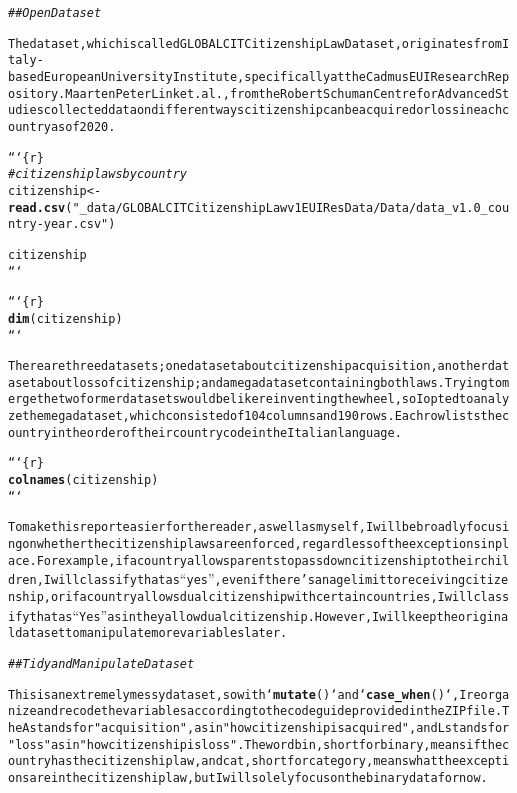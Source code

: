 \documentclass{article}\usepackage[]{graphicx}\usepackage[]{xcolor}
\makeatletter
\newcommand{\hlstr}[1]{\textcolor[rgb]{0.192,0.494,0.8}{#1}}%
\newcommand{\hlcom}[1]{\textcolor[rgb]{0.678,0.584,0.686}{\textit{#1}}}%
\newcommand{\hlkwd}[1]{\textcolor[rgb]{0.737,0.353,0.396}{\textbf{#1}}}%
\newenvironment{kframe}{%
 \def\at@end@of@kframe{}%
 \ifinner\ifhmode%
  \def\at@end@of@kframe{\end{minipage}}%
  \begin{minipage}{\columnwidth}%
 \fi\fi%
 \def\FrameCommand##1{\hskip\@totalleftmargin \hskip-\fboxsep
 \colorbox{shadecolor}{##1}\hskip-\fboxsep
     \hskip-\linewidth \hskip-\@totalleftmargin \hskip\columnwidth}%
 \MakeFramed {\advance\hsize-\width
   \@totalleftmargin\z@ \linewidth\hsize
   \@setminipage}}%
 {\par\unskip\endMakeFramed%
 \at@end@of@kframe}
\newenvironment{knitrout}{}{} %
\makeatother
\begin{document}
\begin{knitrout}
\begin{kframe}
\begin{alltt}
\hlcom{## Open Dataset}

The dataset, which is called GLOBALCIT Citizenship Law Dataset, originates from Italy-based European University Institute, specifically at the Cadmus EUI Research Repository. Maarten Peter Link et. al., from the Robert Schuman Centre for Advanced Studies collected data on different ways citizenship can be acquired or loss in each country as of 2020. 


```\{r\}
\hlcom{# citizenship laws by country}
citizenship <- \hlkwd{read.csv}(\hlstr{"_data/GLOBALCIT Citizenship Law v1 EUI ResData/Data/data_v1.0_country-year.csv"})

citizenship
```

```\{r\}
\hlkwd{dim}(citizenship)
```

There are three datasets; one dataset about citizenship acquisition, another dataset about loss of citizenship; and a mega dataset containing both laws. Trying to merge the two former datasets would be like reinventing the wheel, so I opted to analyze the mega dataset, which consisted of 104 columns and 190 rows. Each row lists the country in the order of their country code in the Italian language. 

```\{r\}
\hlkwd{colnames}(citizenship)
```

To make this report easier for the reader, as well as myself, I will be broadly focusing on whether the citizenship laws are enforced, regardless of the exceptions in place. For example, if a country allows parents to pass down citizenship to their children, I will classify that as “yes”, even if there’s an age limit to receiving citizenship, or if a country allows dual citizenship with certain countries, I will classify that as “Yes” as in they allow dual citizenship. However, I will keep the original dataset to manipulate more variables later.

\hlcom{## Tidy and Manipulate Dataset}

This is an extremely messy dataset, so with `\hlkwd{mutate}()` and `\hlkwd{case_when}()`, I reorganize and recode the variables according to the code guide provided in the ZIP file. The A stands for \hlstr{"acquisition"}, as in \hlstr{"how citizenship is acquired"}, and L stands for \hlstr{"loss"} as in \hlstr{"how citizenship is loss"}. The word bin, short for binary, means if the country has the citizenship law, and cat, short for category, means what the exceptions are in the citizenship law, but I will solely focus on the binary data for now.


\end{alltt}
\end{kframe}
\end{knitrout}
\end{document}
